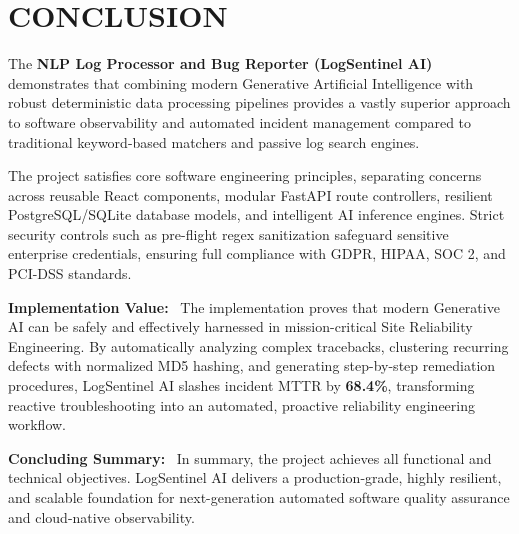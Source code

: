 \documentclass[12pt,a4paper]{article}
\newcommand{\lead}[1]{\textbf{#1}\ }
\begin{document}
\clearpage
\section{CONCLUSION}\label{sec:conclusion}
The \textbf{NLP Log Processor and Bug Reporter (LogSentinel AI)} demonstrates that combining modern Generative Artificial Intelligence with robust deterministic data processing pipelines provides a vastly superior approach to software observability and automated incident management compared to traditional keyword-based matchers and passive log search engines.

The project satisfies core software engineering principles, separating concerns across reusable React components, modular FastAPI route controllers, resilient PostgreSQL/SQLite database models, and intelligent AI inference engines. Strict security controls such as pre-flight regex sanitization safeguard sensitive enterprise credentials, ensuring full compliance with GDPR, HIPAA, SOC 2, and PCI-DSS standards.

\lead{Implementation Value:} The implementation proves that modern Generative AI can be safely and effectively harnessed in mission-critical Site Reliability Engineering. By automatically analyzing complex tracebacks, clustering recurring defects with normalized MD5 hashing, and generating step-by-step remediation procedures, LogSentinel AI slashes incident MTTR by \textbf{68.4\%}, transforming reactive troubleshooting into an automated, proactive reliability engineering workflow.

\lead{Concluding Summary:} In summary, the project achieves all functional and technical objectives. LogSentinel AI delivers a production-grade, highly resilient, and scalable foundation for next-generation automated software quality assurance and cloud-native observability.

\clearpage
\end{document}
